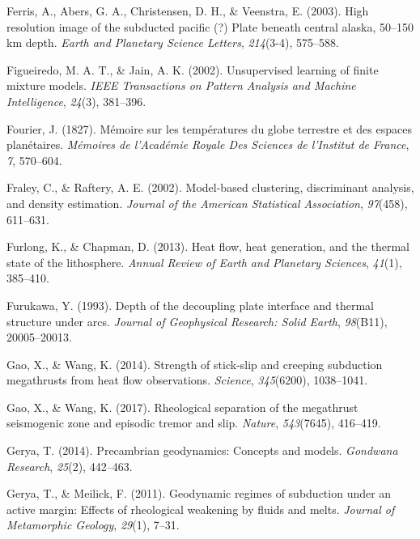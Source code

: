 \begin{CSLReferences}{1}{1}
\leavevmode{}%
Ferris, A., Abers, G. A., Christensen, D. H., \& Veenstra, E. (2003). High resolution image of the subducted pacific (?) Plate beneath central alaska, 50--150 km depth. \emph{Earth and Planetary Science Letters}, \emph{214}(3-4), 575--588.

\leavevmode{}%
Figueiredo, M. A. T., \& Jain, A. K. (2002). Unsupervised learning of finite mixture models. \emph{IEEE Transactions on Pattern Analysis and Machine Intelligence}, \emph{24}(3), 381--396.

\leavevmode{}%
Fourier, J. (1827). Mémoire sur les températures du globe terrestre et des espaces planétaires. \emph{Mémoires de l'Académie Royale Des Sciences de l'Institut de France}, \emph{7}, 570--604.

\leavevmode{}%
Fraley, C., \& Raftery, A. E. (2002). Model-based clustering, discriminant analysis, and density estimation. \emph{Journal of the American Statistical Association}, \emph{97}(458), 611--631.

\leavevmode{}%
Furlong, K., \& Chapman, D. (2013). Heat flow, heat generation, and the thermal state of the lithosphere. \emph{Annual Review of Earth and Planetary Sciences}, \emph{41}(1), 385--410.

\leavevmode{}%
Furukawa, Y. (1993). Depth of the decoupling plate interface and thermal structure under arcs. \emph{Journal of Geophysical Research: Solid Earth}, \emph{98}(B11), 20005--20013.

\leavevmode{}%
Gao, X., \& Wang, K. (2014). Strength of stick-slip and creeping subduction megathrusts from heat flow observations. \emph{Science}, \emph{345}(6200), 1038--1041.

\leavevmode{}%
Gao, X., \& Wang, K. (2017). Rheological separation of the megathrust seismogenic zone and episodic tremor and slip. \emph{Nature}, \emph{543}(7645), 416--419.

\leavevmode{}%
Gerya, T. (2014). Precambrian geodynamics: Concepts and models. \emph{Gondwana Research}, \emph{25}(2), 442--463.

\leavevmode{}%
Gerya, T., \& Meilick, F. (2011). Geodynamic regimes of subduction under an active margin: Effects of rheological weakening by fluids and melts. \emph{Journal of Metamorphic Geology}, \emph{29}(1), 7--31.


\end{CSLReferences}
